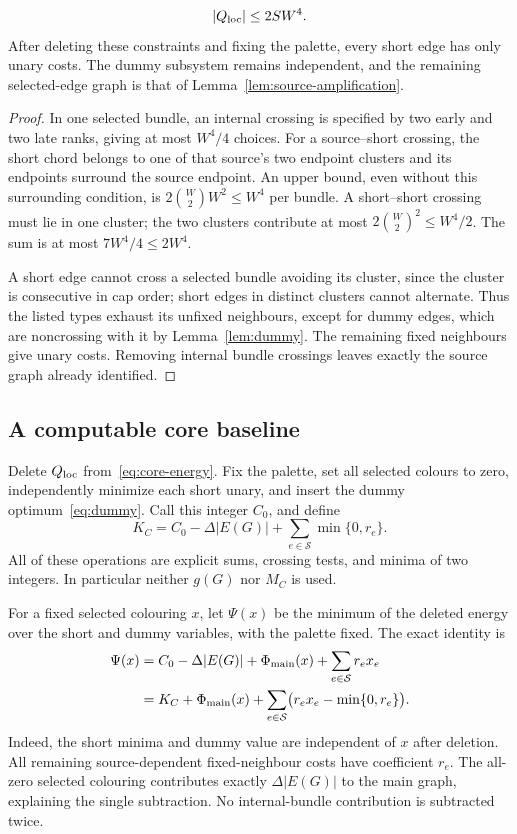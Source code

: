 \begin{lemma}\label{lem:local-count}
\begin{equation}\label{eq:local-budget}
|Q_{\rm loc}|\leq2SW^4.
\end{equation}
After deleting these constraints and fixing the palette, every short edge has only unary costs. The dummy subsystem remains independent, and the remaining selected-edge graph is that of Lemma~\ref{lem:source-amplification}.
\end{lemma}
\begin{proof}
In one selected bundle, an internal crossing is specified by two early and two late ranks, giving at most $W^4/4$ choices. For a source--short crossing, the short chord belongs to one of that source's two endpoint clusters and its endpoints surround the source endpoint. An upper bound, even without this surrounding condition, is
$2\binom W2 W^2\leq W^4$ per bundle. A short--short crossing must lie in one cluster; the two clusters contribute at most $2\binom W2^2\leq W^4/2$. The sum is at most $7W^4/4\leq2W^4$.

A short edge cannot cross a selected bundle avoiding its cluster, since the cluster is consecutive in cap order; short edges in distinct clusters cannot alternate. Thus the listed types exhaust its unfixed neighbours, except for dummy edges, which are noncrossing with it by Lemma~\ref{lem:dummy}. The remaining fixed neighbours give unary costs. Removing internal bundle crossings leaves exactly the source graph already identified.
\end{proof}

\subsection{A computable core baseline}
Delete $Q_{\rm loc}$ from~\eqref{eq:core-energy}. Fix the palette, set all selected colours to zero, independently minimize each short unary, and insert the dummy optimum~\eqref{eq:dummy}. Call this integer $C_0$, and define
\begin{equation}\label{eq:core-baseline}
K_C=C_0-\Delta|E(G)|+\sum_{e\in\mathcal S}\min\{0,r_e\}.
\end{equation}
All of these operations are explicit sums, crossing tests, and minima of two integers. In particular neither $g(G)$ nor $M_C$ is used.

For a fixed selected colouring $x$, let $\Psi(x)$ be the minimum of the deleted energy over the short and dummy variables, with the palette fixed. The exact identity is
\begin{align}
\Psi(x)
&=C_0-\Delta|E(G)|+\Phi_{\rm main}(x)+\sum_{e\in\mathcal S}r_ex_e\notag\\
&=K_C+\Phi_{\rm main}(x)
+\sum_{e\in\mathcal S}\bigl(r_ex_e-\min\{0,r_e\}\bigr).
\label{eq:core-identity}
\end{align}
Indeed, the short minima and dummy value are independent of $x$ after deletion. All remaining source-dependent fixed-neighbour costs have coefficient $r_e$. The all-zero selected colouring contributes exactly $\Delta|E(G)|$ to the main graph, explaining the single subtraction. No internal-bundle contribution is subtracted twice.

